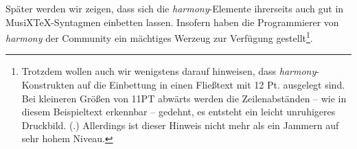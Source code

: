 Später werden wir zeigen, dass sich die \emph{harmony}-Elemente ihrerseits auch
gut in MusiX\TeX-Syntagmen einbetten lassen. Insofern haben die Programmierer
von \emph{harmony} der Community ein mächtiges Werzeug zur Verfügung
gestellt\footnote{Trotzdem wollen auch wir wenigstens darauf hinweisen, dass
\emph{harmony}-Konstrukten auf die Einbettung in einen Fließtext mit 12 Pt.
ausgelegt sind. Bei kleineren Größen von 11PT abwärts werden die Zeilenabständen
-- wie in diesem Beispieltext erkennbar -- gedehnt, es entsteht ein leicht
unruhigeres Druckbild. (\cite[Vgl. dazu][2]{WegWeg2007a}.) Allerdings ist dieser
Hinweis nicht mehr als ein Jammern auf sehr hohem Niveau.}.


%
